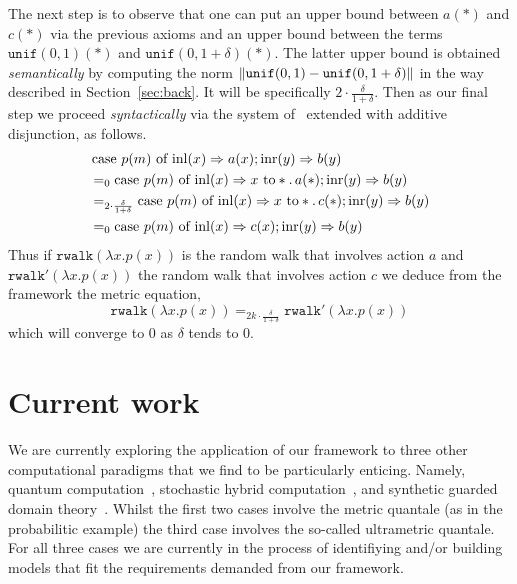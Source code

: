 \documentclass[a4paper,UKenglish,cleveref, autoref, thm-restate]{lipics-v2021}
\begin{document}
\begin{example}
        The next step is to observe that one can put an upper bound between
        $a(\ast)$ and $c(\ast)$ via the previous axioms and an upper bound
        between the terms $\mathtt{unif}(0,1)(\ast)$ and
        $\mathtt{unif}(0,1+\delta)(\ast)$. The latter upper bound is obtained
        \emph{semantically} by computing the norm $\left\lVert \mathtt{unif}(0,1) -
        \mathtt{unif}(0,1+\delta)  \right\rVert$ in the way described in
        Section~\ref{sec:back}. It will be specifically $2 \cdot
        {\frac{\delta}{1 + \delta}}$. Then as our final step we proceed
        \emph{syntactically} via the system
        of~\cite{dahlqvist22,dahlqvist2023syntactic} extended with additive
        disjunction, as follows.
        \begin{align*}
               &\, \text{case } p(m) \text{ of } \mathrm{inl}(x) \Rightarrow a(x) ; 
               \mathrm{inr}(y) \Rightarrow b(y)
               \\
               & =_0
               \text{case } p(m) \text{ of } \mathrm{inl}(x) \Rightarrow x \text{ to} 
               \ast. \, a(\ast) 
               ; 
               \mathrm{inr}(y) \Rightarrow b(y)
               \\
               & =_{2 \cdot {\frac{\delta}{1 + \delta}}}
               \text{case } p(m) \text{ of } \mathrm{inl}(x) \Rightarrow x \text{ to} 
               \ast. \, c(\ast) 
               ; 
               \mathrm{inr}(y) \Rightarrow b(y)
               \\
               & =_0
               \text{case } p(m) \text{ of } \mathrm{inl}(x) \Rightarrow c(x) 
               ; 
               \mathrm{inr}(y) \Rightarrow b(y)
        \end{align*}
        Thus if $\mathtt{rwalk}(\lambda x. p(x))$ is the random walk that
        involves action $a$ and $\mathtt{rwalk'}(\lambda x. p(x))$ the random
        walk that involves action $c$ we deduce from the framework the metric
        equation,
        \[
                \mathtt{rwalk}(\lambda x. p(x)) =_{2k \cdot \frac{\delta}{1 + \delta}}
                \mathtt{rwalk'}(\lambda x. p(x)) 
        \]
        which will converge to $0$ as $\delta$ tends to $0$.
\end{example}

\section{Current work}

We are currently exploring the application of our framework to three other
computational paradigms that we find to be particularly enticing.  Namely,
quantum computation~\cite{nielsen2010quantum}, stochastic hybrid
computation~\cite{neves20}, and synthetic guarded domain
theory~\cite{birkedal12}. Whilst the first two cases involve the metric
quantale (as in the probabilitic example) the third case involves the so-called
ultrametric quantale. For all three cases we are currently in the process of
identifiying and/or building models that fit the requirements demanded from our
framework.
\end{document}
